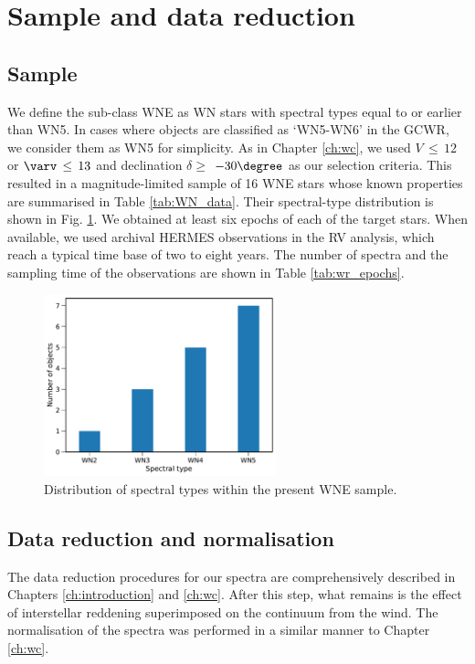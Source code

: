 \section{Sample and data reduction} \label{sect:sample_WNE}
\subsection{Sample}

We define the sub-class WNE as WN stars with spectral types equal to or earlier than WN5. In cases where objects are classified as `WN5-WN6' in the GCWR, we consider them as WN5 for simplicity. As in Chapter \ref{ch:wc}, we used $V\,\leq\,12$ or $\varv\,\leq\,13$ and declination $\delta \ge$ $-30\degree$ as our selection criteria. This resulted in a magnitude-limited sample of 16 WNE stars whose known properties are summarised in Table \ref{tab:WN_data}. Their spectral-type distribution is shown in Fig. \ref{fig:target_dist_WNE}. We obtained at least six epochs of each of the target stars. When available, we used archival HERMES observations in the RV analysis, which reach a typical time base of two to eight years. The number of spectra and the sampling time of the observations are shown in Table \ref{tab:wr_epochs}.

\begin{figure}[!h]
    \centering
    \includegraphics[width=0.6\textwidth]{chapters/WNE/image/target_dist.pdf}
    \caption{Distribution of spectral types within the present WNE sample.}
    \label{fig:target_dist_WNE}
\end{figure}


\subsection{Data reduction and normalisation}
The data reduction procedures for our spectra are comprehensively described in Chapters \ref{ch:introduction} and \ref{ch:wc}. After this step, what remains is the effect of interstellar reddening superimposed on the continuum from the wind. The normalisation of the spectra was performed in a similar manner to Chapter \ref{ch:wc}.

